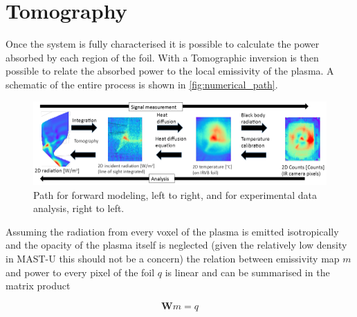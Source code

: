 \section{Tomography}\label{Tomography}
Once the system is fully characterised it is possible to calculate the power absorbed by each region of the foil. With a Tomographic inversion is then possible to relate the absorbed power to the local emissivity of the plasma. A schematic of the entire process is shown in \autoref{fig:numerical_path}.

\begin{figure}
	\centering
	\includegraphics[width=\linewidth]{Chapters/chapter2/figs/numerical_path.png}
	\caption{Path for forward modeling, left to right, and for experimental data analysis, right to left.}
	\label{fig:numerical_path}
\end{figure}

Assuming the radiation from every voxel of the plasma is emitted isotropically and the opacity of the plasma itself is neglected (given the relatively low density in MAST-U this should not be a concern\cite{Verhaegh2021a,Terry1998,Soukhanovskii2022}) the relation between emissivity map $m$ and power to every pixel of the foil $q$ is linear and can be summarised in the matrix product

\begin{equation}
\bm{W}m=q
\label{eq:gmq}
\end{equation}

